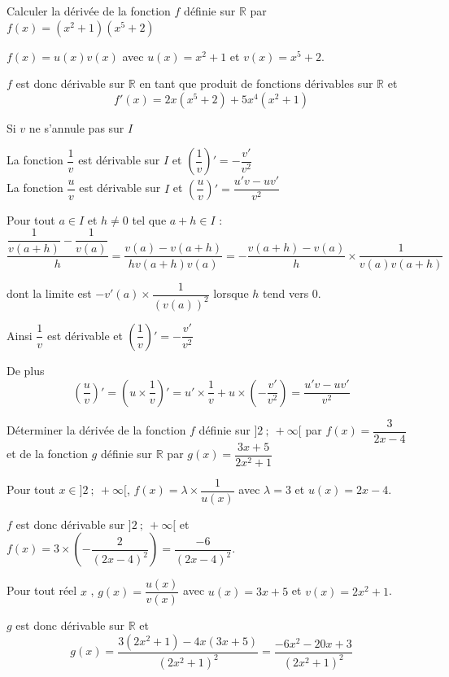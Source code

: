 \documentclass[french]{book}
\newcommand{\R}{\mathbb {R}}
\begin{document}
\begin{exemple}
Calculer la dérivée de la fonction $f$ définie sur $\R$ par $f(x)=(x^{2}+1)(x^{5}+2)$
\end{exemple}


$f(x)=u(x)v(x)$ avec $u(x)=x^{2}+1$ et $v(x)=x^{5}+2$.

$f$ est donc dérivable sur $\R$ en tant que produit de fonctions dérivables sur $\R$ et
\[f'(x)=2x(x^{5}+2)+5x^{4}(x^{2}+1)\]


\begin{prop}
Si $v$ ne s'annule pas sur $I$

La fonction $\dfrac{1}{v}$ est dérivable sur $I$ et  $\left(\dfrac{1}{v}\right)'=-\dfrac{v'}{v^{2}}$\\
La fonction $\dfrac{u}{v}$ est dérivable sur $I$ et  $\left(\dfrac{u}{v}\right)'=\dfrac{u'v-uv'}{v^{2}}$
\end{prop}

\begin{demo}
Pour tout $a\in I$ et $h\neq 0$ tel que $a+h\in I$ :
\[\dfrac{\dfrac{1}{v(a+h)}-\dfrac{1}{v(a)}}{h}=\dfrac{v(a)-v(a+h)}{hv(a+h)v(a)}=-\dfrac{v(a+h)-v(a)}{h}\times \dfrac{1}{v(a)v(a+h)}\]

dont la limite est $-v'(a)\times \dfrac{1}{(v(a))^{2}}$ lorsque $h$ tend vers 0.

Ainsi $\dfrac{1}{v}$ est dérivable et $\left(\dfrac{1}{v}\right)'=-\dfrac{v'}{v^{2}}$

De plus \[\left(\dfrac{u}{v}\right)'=\left(u\times \dfrac{1}{v}\right)'=u'\times \dfrac{1}{v}+u\times \left(-\dfrac{v'}{v^{2}}\right)=\dfrac{u'v-uv'}{v^{2}}\]
\end{demo}

\begin{exemple}
Déterminer la dérivée de la fonction $f$ définie sur $]2~;~+\infty[$ par $f(x)=\dfrac{3}{2x-4}$ et de la fonction $g$ définie sur $\R$ par $g(x)=\dfrac{3x+5}{2x^{2}+1}$
\end{exemple}


Pour tout $x\in]2~;~+\infty[$, $f(x)=\lambda\times \dfrac{1}{u(x)}$ avec $\lambda=3$ et $u(x)=2x-4$.

$f$ est donc dérivable sur $]2~;~+\infty[$ et $f(x)=3\times \left(-\dfrac{2}{(2x-4)^{2}}\right)=\dfrac{-6}{(2x-4)^{2}}$.

Pour tout réel $x$ , $g(x)=\dfrac{u(x)}{v(x)}$ avec $u(x)=3x+5$ et $v(x)=2x^{2}+1$.

$g$ est donc dérivable sur $\R$ et \[g(x)=\dfrac{3(2x^{2}+1)-4x(3x+5)}{(2x^{2}+1)^{2}}=\dfrac{-6x^2-20x+3}{(2x^{2}+1)^{2}}\]
\end{document}
